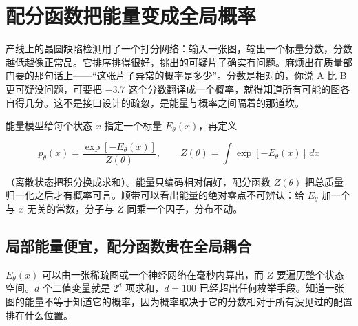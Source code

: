 \section{配分函数把能量变成全局概率}
\label{sec:13-Machine-Learning/08-Sampling-and-Inference/06}

产线上的晶圆缺陷检测用了一个打分网络：输入一张图，输出一个标量分数，分数越低越像正常品。它排序排得很好，挑出的可疑片子确实有问题。麻烦出在质量部门要的那句话上——``这张片子异常的概率是多少''。分数是相对的，你说 A 比 B 更可疑没问题，可要把 \(-3.7\) 这个分数翻译成一个概率，就得知道所有可能的图各自得几分。这不是接口设计的疏忽，是能量与概率之间隔着的那道坎。

能量模型给每个状态 \(x\) 指定一个标量 \(E_\theta(x)\)，再定义

\[
p_\theta(x)=\frac{\exp[-E_\theta(x)]}{Z(\theta)},
\qquad
Z(\theta)=\int\exp[-E_\theta(x)]\,dx
\]

（离散状态把积分换成求和）。能量只编码相对偏好，配分函数 \(Z(\theta)\) 把总质量归一化之后才有概率可言。顺带可以看出能量的绝对零点不可辨认：给 \(E_\theta\) 加一个与 \(x\) 无关的常数，分子与 \(Z\) 同乘一个因子，分布不动。

\subsection{局部能量便宜，配分函数贵在全局耦合}

\(E_\theta(x)\) 可以由一张稀疏图或一个神经网络在毫秒内算出，而 \(Z\) 要遍历整个状态空间。\(d\) 个二值变量就是 \(2^d\) 项求和，\(d=100\) 已经超出任何枚举手段。知道一张图的能量不等于知道它的概率，因为概率取决于它的分数相对于所有没见过的配置排在什么位置。

